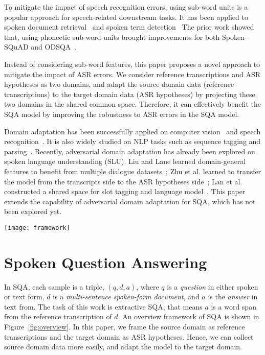 \documentclass{article}
\begin{document}
To mitigate the impact of speech recognition errors, using sub-word units is a popular approach for speech-related downstream tasks.
It has been applied to spoken document retrieval~\cite{ng1997subword} and spoken term detection~\cite{van2017constructing}
The prior work showed that, using phonectic sub-word units brought improvements for both Spoken-SQuAD and ODSQA~\cite{li2018spoken}.


Instead of considering sub-word features, this paper proposes a novel approach to mitigate the impact of ASR errors.
We consider reference transcriptions  and ASR hypotheses as two domains, and
adapt the source domain data (reference transcriptions) to the target domain data (ASR hypotheses) by projecting these two domains in the shared common space.
Therefore, it can effectively benefit the SQA model by improving the robustness to ASR errors in the SQA model.

Domain adaptation has been successfully applied on computer vision~\cite{ganin2016domain} and speech recognition~\cite{shinohara2016adversarial}. 
It is also widely studied on NLP tasks such as sequence tagging and parsing~\cite{yang2017transfer,mcclosky2010automatic,chiticariu2010domain}. 
Recently, adversarial domain adaptation has already been explored on spoken language understanding (SLU).
Liu and Lane learned domain-general features to benefit from multiple dialogue datasets~\cite{liu2017multi}; Zhu et al. learned to transfer the model from the transcripts side to the ASR hypotheses side~\cite{zhu2018robust}; Lan et al. constructed a shared space for slot tagging and language model~\cite{lan2018semi}.
This paper extends the capability of adversarial domain adaptation for SQA, which has not been explored yet. 


\begin{figure*}[t]
  \vspace{-3mm}
  \centering
  \texttt{[image: framework]}
  \vspace{-5mm}
  \caption{Flow diagram of the SQA system. }
  \label{fig:overview}


\end{figure*}


\section{Spoken Question Answering}

In SQA, each sample is a triple, $(q, d, a)$, where $q$ is a \emph{question} in either spoken or text form, $d$ is a \emph{multi-sentence spoken-form document}, and $a$ is the \emph{answer} in text from.
The task of this work is extractive SQA; that means $a$ is a word span from the reference transcription of $d$.
An overview framework of SQA is shown in Figure~\ref{fig:overview}.
In this paper, we frame the source domain as reference transcriptions and the target domain as ASR hypotheses.
Hence, we can collect source domain data more easily, and adapt the model to the target domain.
\end{document}

